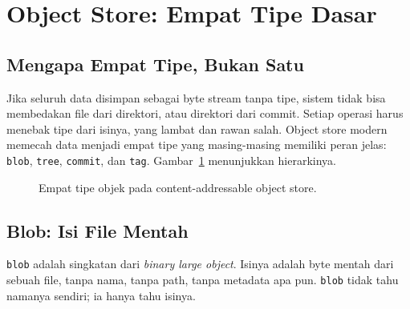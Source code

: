 \documentclass[11pt,a4paper]{article}
\begin{document}
\section{Object Store: Empat Tipe Dasar}

\subsection{Mengapa Empat Tipe, Bukan Satu}

Jika seluruh data disimpan sebagai byte stream tanpa tipe, sistem tidak bisa membedakan file dari direktori, atau direktori dari commit. Setiap operasi harus menebak tipe dari isinya, yang lambat dan rawan salah. Object store modern memecah data menjadi empat tipe yang masing-masing memiliki peran jelas: \texttt{blob}, \texttt{tree}, \texttt{commit}, dan \texttt{tag}. Gambar~\ref{fig:object-types} menunjukkan hierarkinya.

\begin{figure}[H]
	\centering
	\caption{Empat tipe objek pada content-addressable object store.}
	\label{fig:object-types}
\end{figure}

\subsection{Blob: Isi File Mentah}

\texttt{blob} adalah singkatan dari \textit{binary large object}. Isinya adalah byte mentah dari sebuah file, tanpa nama, tanpa path, tanpa metadata apa pun. \texttt{blob} tidak tahu namanya sendiri; ia hanya tahu isinya.
\end{document}

